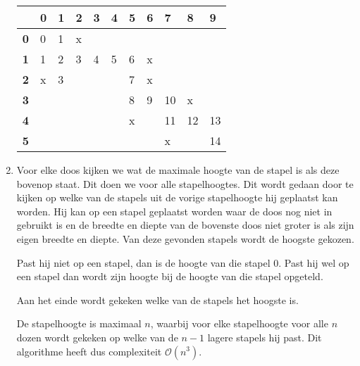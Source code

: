 \documentclass[11pt]{article}
\newcommand{\bigO}{\ensuremath{\mathcal{O}}}
\begin{document}
\begin{enumerate}
\begin{table}[h]
\centering
\begin{tabular}{lllllllllll}
\hline
           & \textbf{0} & \textbf{1} & \textbf{2} & \textbf{3} & \textbf{4} & \textbf{5} & \textbf{6} & \textbf{7} & \textbf{8} & \textbf{9} \\ \hline
\textbf{0} & 0          & 1          & x          &            &            &            &            &            &            &            \\
\textbf{1} & 1          & 2          & 3          & 4          & 5          & 6          & x          &            &            &            \\
\textbf{2} & x          & 3          &            &            &            & 7          & x          &            &            &            \\
\textbf{3} &            &            &            &            &            & 8          & 9          & 10         & x          &            \\
\textbf{4} &            &            &            &            &            & x          &            & 11         & 12         & 13         \\
\textbf{5} &            &            &            &            &            &            &            & x &            & 14         \\ \hline
\end{tabular}
\end{table}



    \item
        Voor elke doos kijken we wat de maximale hoogte van de stapel is als
        deze bovenop staat. Dit doen we voor alle stapelhoogtes. Dit wordt
        gedaan door te kijken op welke van de stapels uit de vorige stapelhoogte
        hij geplaatst kan worden. Hij kan op een stapel geplaatst worden waar de
        doos nog niet in gebruikt is en de breedte en diepte van de bovenste
        doos niet groter is als zijn eigen breedte en diepte. Van deze gevonden
        stapels wordt de hoogste gekozen.

        Past hij niet op een stapel, dan is de hoogte van die stapel 0. Past hij
        wel op een stapel dan wordt zijn hoogte bij de hoogte van die stapel
        opgeteld.

        Aan het einde wordt gekeken welke van de stapels het hoogste is.

        De stapelhoogte is maximaal $n$, waarbij voor elke stapelhoogte voor
        alle $n$ dozen wordt gekeken op welke van de $n - 1$ lagere stapels hij
        past. Dit algorithme heeft dus complexiteit \bigO$(n^3)$.


\end{enumerate}
\end{document}
